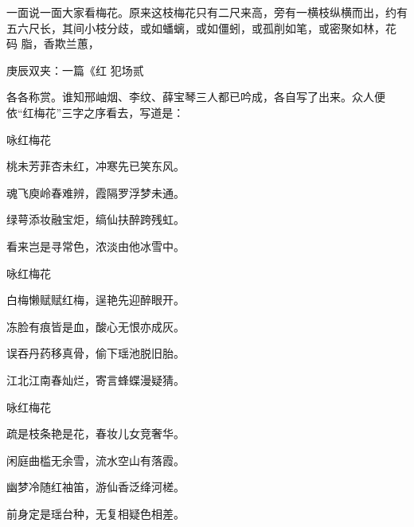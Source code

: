 \begin{parag}
    一面说一面大家看梅花。原来这枝梅花只有二尺来高，旁有一横枝纵横而出，约有五六尺长，其间小枝分歧，或如蟠螭，或如僵蚓，或孤削如笔，或密聚如林，花 码 脂，香欺兰蕙，\begin{note}庚辰双夹：一篇《红 犯场贰\end{note}各各称赏。谁知邢岫烟、李纹、薛宝琴三人都已吟成，各自写了出来。众人便依“红梅花”三字之序看去，写道是：
\end{parag}


\begin{poem}
    \begin{pl}咏红梅花\end{pl}

    \begin{pl}桃未芳菲杏未红，冲寒先已笑东风。\end{pl}

    \begin{pl}魂飞庾岭春难辨，霞隔罗浮梦未通。\end{pl}

    \begin{pl}绿萼添妆融宝炬，缟仙扶醉跨残虹。\end{pl}

    \begin{pl}看来岂是寻常色，浓淡由他冰雪中。\end{pl}
    \emptypl

    \begin{pl}咏红梅花\end{pl}

    \begin{pl}白梅懒赋赋红梅，逞艳先迎醉眼开。\end{pl}

    \begin{pl}冻脸有痕皆是血，酸心无恨亦成灰。\end{pl}

    \begin{pl}误吞丹药移真骨，偷下瑶池脱旧胎。\end{pl}

    \begin{pl}江北江南春灿烂，寄言蜂蝶漫疑猜。\end{pl}
    \emptypl

    \begin{pl}咏红梅花\end{pl}

    \begin{pl}疏是枝条艳是花，春妆儿女竞奢华。\end{pl}

    \begin{pl}闲庭曲槛无余雪，流水空山有落霞。\end{pl}

    \begin{pl}幽梦冷随红袖笛，游仙香泛绛河槎。\end{pl}

    \begin{pl}前身定是瑶台种，无复相疑色相差。\end{pl}
\end{poem}


